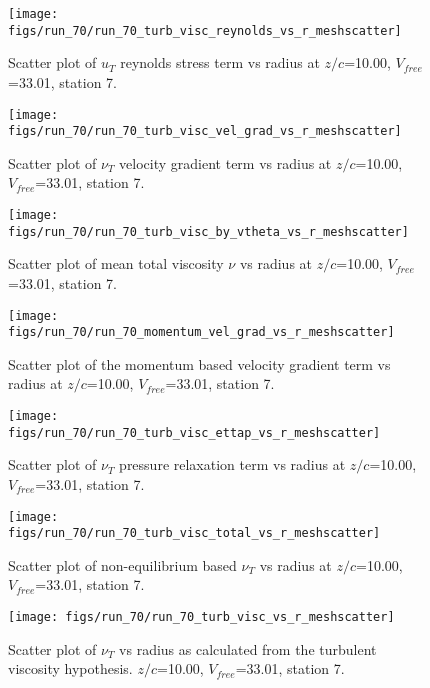 \begin{figure}[H]
\centering
\texttt{[image: figs/run\_70/run\_70\_turb\_visc\_reynolds\_vs\_r\_meshscatter]}
\caption{Scatter plot of $
u_T$ reynolds stress term vs radius at $z/c$=10.00, $V_{free}$=33.01, station 7.}
\end{figure}


\begin{figure}[H]
\centering
\texttt{[image: figs/run\_70/run\_70\_turb\_visc\_vel\_grad\_vs\_r\_meshscatter]}
\caption{Scatter plot of $\nu_T$ velocity gradient term vs radius at $z/c$=10.00, $V_{free}$=33.01, station 7.}
\end{figure}


\begin{figure}[H]
\centering
\texttt{[image: figs/run\_70/run\_70\_turb\_visc\_by\_vtheta\_vs\_r\_meshscatter]}
\caption{Scatter plot of mean total viscosity $\nu$ vs radius at $z/c$=10.00, $V_{free}$=33.01, station 7.}
\end{figure}


\begin{figure}[H]
\centering
\texttt{[image: figs/run\_70/run\_70\_momentum\_vel\_grad\_vs\_r\_meshscatter]}
\caption{Scatter plot of the momentum based velocity gradient term vs radius at $z/c$=10.00, $V_{free}$=33.01, station 7.}
\end{figure}


\begin{figure}[H]
\centering
\texttt{[image: figs/run\_70/run\_70\_turb\_visc\_ettap\_vs\_r\_meshscatter]}
\caption{Scatter plot of $\nu_T$ pressure relaxation term vs radius at $z/c$=10.00, $V_{free}$=33.01, station 7.}
\end{figure}


\begin{figure}[H]
\centering
\texttt{[image: figs/run\_70/run\_70\_turb\_visc\_total\_vs\_r\_meshscatter]}
\caption{Scatter plot of non-equilibrium based $\nu_T$ vs radius at $z/c$=10.00, $V_{free}$=33.01, station 7.}
\end{figure}


\begin{figure}[H]
\centering
\texttt{[image: figs/run\_70/run\_70\_turb\_visc\_vs\_r\_meshscatter]}
\caption{Scatter plot of $\nu_T$ vs radius as calculated from the turbulent viscosity hypothesis. $z/c$=10.00, $V_{free}$=33.01, station 7.}
\end{figure}


